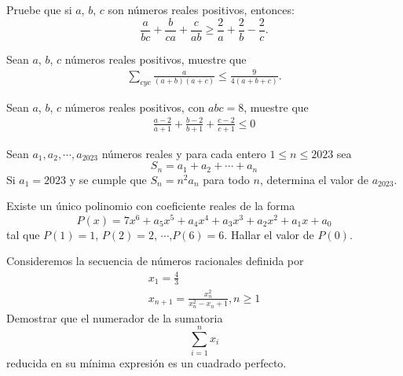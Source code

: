 \begin{section-problem}
    Pruebe que si $a$, $b$, $c$ son números reales positivos, entonces:
    \[\frac{a}{bc} + \frac{b}{ca} + \frac{c}{ab} \geq \frac{2}{a} + \frac{2}{b} - \frac{2}{c}.\]
\end{section-problem}

\begin{section-problem}
    Sean $a$, $b$, $c$ números reales positivos, muestre que
    \begin{gather*}
        \sum_{cyc} \frac{a}{(a + b)(a + c)} \leq \frac{9}{4(a + b + c)}.
    \end{gather*}
\end{section-problem}

\begin{section-problem}
    Sean $a$, $b$, $c$ números reales positivos, con $abc = 8$, muestre que
    \begin{gather*}
        \frac{a - 2}{a + 1} +
        \frac{b - 2}{b + 1} +
        \frac{c - 2}{c + 1} \leq 0
    \end{gather*}
\end{section-problem}

\begin{section-problem}
    Sean $a_1, a_2, \cdots, a_{2023}$ números reales y para cada entero $1 \leq n \leq 2023$ sea
    \[S_n = a_1 + a_2 + \cdots + a_n\]
    Si $a_1 = 2023$ y se cumple que $S_n =  n^2 a_n$ para todo $n$, determina el valor de $a_{2023}$.
\end{section-problem}

\begin{section-problem}
    Existe un único polinomio con coeficiente reales de la forma
    \[P(x) =  7x^6 + a_5 x^5 + a_4 x^4 + a_3 x^3 + a_2 x^2 + a_1 x + a_0\]
    tal que $P(1) = 1$, $P(2) = 2$, $\cdots$,$P(6) = 6$.
    Hallar el valor de $P(0)$.
\end{section-problem}

\begin{section-problem}
    Consideremos la secuencia de números racionales definida por
    \begin{gather*}
        x_1 = \frac{4}{3} \\
        x_{n + 1} = \frac{x_n^2}{x_n^2 - x_n + 1}, n \geq 1
    \end{gather*}
    Demostrar que el numerador de la sumatoria
    \[\sum_{i = 1}^{n} x_i\]
    reducida en su mínima expresión es un cuadrado perfecto.
\end{section-problem}

